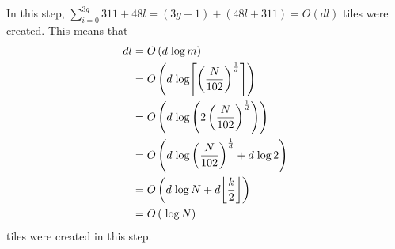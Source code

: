 %
In this step, $\sum^{3g}_{i = 0} 311 + 48l = (3g + 1) + (48l + 311) = O\left( dl \right)$ tiles were created.
%
This means that
\begin{align*}
    dl &= O\left( d \hspace{0.1cm} {\log m} \right) \\
       &= O\left( d \hspace{0.1cm} {\log \ceil*{\left(\frac{N}{102}\right)^{\frac{1}{d}}}} \right) \\
       &= O \left(d \hspace{0.1cm} {\log \left( 2 \left( \frac{N}{102} \right)^{ \frac{1}{d} } \right) } \right) \\
       &= O \left(d \hspace{0.1cm} {\log \left( \frac{N}{102} \right)^{ \frac{1}{d} } }  + d \hspace{0.1cm} {\log 2} \right) \\
       &= O \left(d \hspace{0.1cm} {\log N} + d  \floor*{\frac{k}{2} } \right) \\
       &= O \left(\hspace{0.1cm} {\log N} \right) \\
\end{align*}
tiles were created in this step.
%


